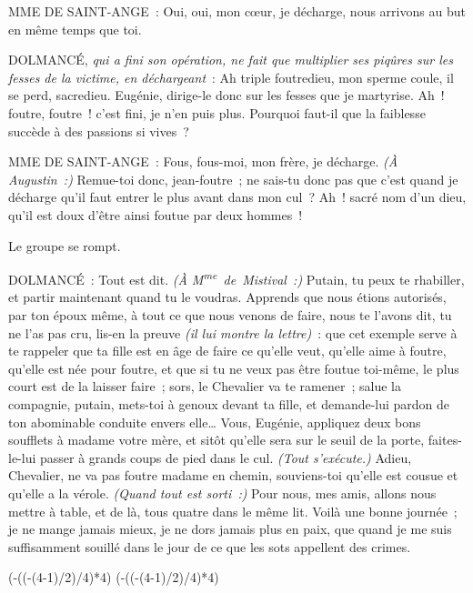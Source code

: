 \documentclass[french,twoside]{book} %
\def\truncdiv#1#2{((#1-(#2-1)/2)/#2)}
\def\moduloop#1#2{(#1-\truncdiv{#1}{#2}*#2)}
\def\modulo#1#2{\number\numexpr\moduloop{#1}{#2}\relax}
\begin{document}
MME DE SAINT-ANGE : Oui, oui, mon cœur, je décharge, nous arrivons au but en même temps que toi.\par
DOLMANCÉ, {\itshape qui a fini son opération, ne fait que multiplier ses piqûres sur les fesses de la victime, en déchargeant} : Ah triple foutredieu, mon sperme coule, il se perd, sacredieu. Eugénie, dirige-le donc sur les fesses que je martyrise. Ah ! foutre, foutre ! c’est fini, je n’en puis plus. Pourquoi faut-il que la faiblesse succède à des passions si vives ?\par
MME DE SAINT-ANGE : Fous, fous-moi, mon frère, je décharge. {\itshape (À Augustin :)} Remue-toi donc, jean-foutre ; ne sais-tu donc pas que c’est quand je décharge qu’il faut entrer le plus avant dans mon cul ? Ah ! sacré nom d’un dieu, qu’il est doux d’être ainsi foutue par deux hommes !\par
Le groupe se rompt.\par
DOLMANCÉ : Tout est dit. {\itshape (À M\textsuperscript{me} de Mistival :)} Putain, tu peux te rhabiller, et partir maintenant quand tu le voudras. Apprends que nous étions autorisés, par ton époux même, à tout ce que nous venons de faire, nous te l’avons dit, tu ne l’as pas cru, lis-en la preuve {\itshape (il lui montre la lettre)} : que cet exemple serve à te rappeler que ta fille est en âge de faire ce qu’elle veut, qu’elle aime à foutre, qu’elle est née pour foutre, et que si tu ne veux pas être foutue toi-même, le plus court est de la laisser faire ; sors, le Chevalier va te ramener ; salue la compagnie, putain, mets-toi à genoux devant ta fille, et demande-lui pardon de ton abominable conduite envers elle… Vous, Eugénie, appliquez deux bons soufflets à madame votre mère, et sitôt qu’elle sera sur le seuil de la porte, faites-le-lui passer à grands coups de pied dans le cul. {\itshape (Tout s’exécute.)} Adieu, Chevalier, ne va pas foutre madame en chemin, souviens-toi qu’elle est cousue et qu’elle a la vérole. {\itshape (Quand tout est sorti :)} Pour nous, mes amis, allons nous mettre à table, et de là, tous quatre dans le même lit. Voilà une bonne journée ; je ne mange jamais mieux, je ne dors jamais plus en paix, que quand je me suis suffisamment souillé dans le jour de ce que les sots appellent des crimes.
 


\ifbooklet
  \pagestyle{empty}
  \clearpage
  \ifnum\modulo{\value{page}}{4}=0 \hbox{}\newpage\hbox{}\newpage\fi
  \ifnum\modulo{\value{page}}{4}=1 \hbox{}\newpage\hbox{}\newpage\fi
\end{document}
